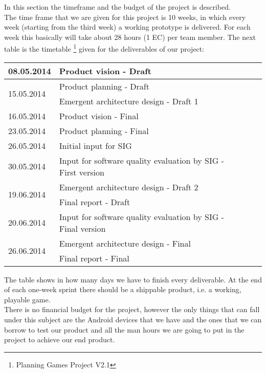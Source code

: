 In this section the timeframe and the budget of the project is described. \\
The time frame that we are given for this project is 10 weeks, in which every week (starting from the third week) a working prototype is delivered. For each week this basically will take about 28 hours (1 EC) per team member. 
The next table is the timetable \footnote{Planning Games Project V2.1} given for the deliverables of our project:
\begin{center}
	\begin{tabular}{|  p{5cm}| l | p{10cm}  l }
		\hline
	 	08.05.2014 & Product vision - Draft \\ \hline
		\multirow{2}{*}{15.05.2014} & Product planning - Draft \\ \cline{2-2}
		& Emergent architecture design - Draft 1 \\ \hline
		16.05.2014 & Product vision - Final \\ \hline
		23.05.2014 & Product planning - Final \\ \hline
		26.05.2014 & Initial input for SIG \\ \hline
		30.05.2014 & Input for software quality evaluation by SIG - First version \\ \hline
		\multirow{2}{*}{19.06.2014} & Emergent architecture design - Draft 2 \\ \cline{2-2}
		& Final report - Draft \\ \hline
		20.06.2014 & Input for software quality evaluation by SIG - Final version \\ \hline
		\multirow{2}{*}{26.06.2014} & Emergent architecture design - Final \\ \cline{2-2}
		& Final report - Final \\ \hline
	\end{tabular}
\end{center}
The table shows in how many days we have to finish every deliverable. At the end of each one-week sprint there should be a shippable product, i.e. a working, playable game. \\
\newline
There is no financial budget for the project, however the only things that can fall under this subject are the Android devices that we have and the ones that we can borrow to test our product and all the man hours we are going to put in the project to achieve our end product.